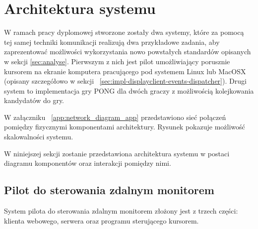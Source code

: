 \newpage
\section{Architektura systemu}

W ramach pracy dyplomowej stworzone zostały dwa systemy, które za pomocą tej samej techniki komunikacji realizują dwa przykładowe zadania, aby zaprezentować możliwości wykorzystania nowo powstałych standardów opisanych w sekcji \ref{sec:analyse}. Pierwszym z nich jest pilot umożliwiający porusznie kursorem na ekranie komputera pracującego pod systemem Linux lub MacOSX (opisany szczegółowo w sekcji ~\ref{sec:impl-displayclient-events-dispatcher}). Drugi system to implementacja gry PONG dla dwóch graczy z możliwością kolejkowania kandydatów do gry.

W załączniku ~\ref{app:network_diagram_app} przedstawiono sieć połączeń pomiędzy fizycznymi komponentami architektury. Rysunek pokazuje możliwość skalowalności systemu.

W niniejszej sekcji zostanie przedstawiona architektura systemu w postaci diagramu komponentów oraz interakcji pomiędzy nimi.

\subsection{Pilot do sterowania zdalnym monitorem}

System pilota do sterowania zdalnym monitorem złożony jest z trzech części: klienta webowego, serwera oraz programu sterującego kursorem.

